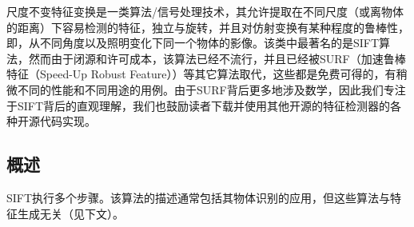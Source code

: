 尺度不变特征变换是一类算法/信号处理技术，其允许提取在不同尺度（或离物体的距离）下容易检测的特征，独立与旋转，并且对仿射变换有某种程度的鲁棒性，即，从不同角度以及照明变化下同一个物体的影像。该类中最著名的是SIFT算法\cite{lowe1999object}，然而由于闭源和许可成本，该算法已经不流行，并且已经被SURF（加速鲁棒特征（Speed-Up Robust Feature））等其它算法取代，这些都是免费可得的，有稍微不同的性能和不同用途的用例。由于SURF背后更多地涉及数学，因此我们专注于SIFT背后的直观理解，我们也鼓励读者下载并使用其他开源的特征检测器的各种开源代码实现。



\subsection{概述}

SIFT执行多个步骤。该算法的描述通常包括其物体识别的应用，但这些算法与特征生成无关（见下文）。

